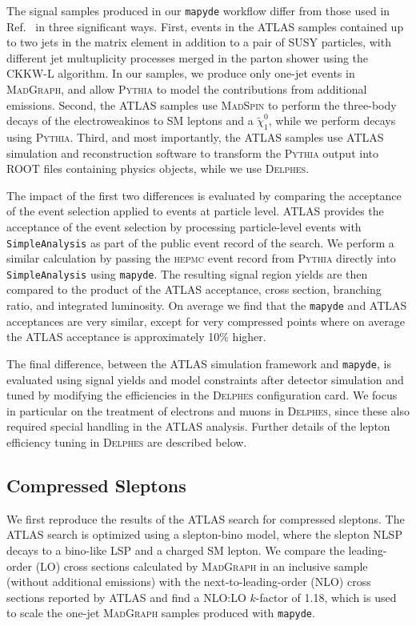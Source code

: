\documentclass{article}
\newcommand{\chioz}{\ensuremath{\widetilde{\chi}_{1}^{0}}}
\newcommand{\mapyde}{\texttt{mapyde}}
\newcommand{\simpleanalysis}{\texttt{SimpleAnalysis}}
\newcommand{\madgraph}{\textsc{MadGraph}}
\newcommand{\madspin}{\textsc{MadSpin}}
\newcommand{\pythia}{\textsc{Pythia}}
\newcommand{\delphes}{\textsc{Delphes}}
\newcommand{\hepmc}{\textsc{hepmc}}
\begin{document}
The signal samples produced in our \mapyde{} workflow differ from those used in Ref.~\cite{ATLAS:2019lng} in three significant ways.  First, events in the ATLAS samples contained up to two jets in the matrix element in addition to a pair of SUSY particles, with different jet multuplicity processes merged in the parton shower using the CKKW-L algorithm.  In our samples, we produce only one-jet events in \madgraph, and allow \pythia{} to model the contributions from additional emissions.  Second, the ATLAS samples use \madspin{} to perform the three-body decays of the electroweakinos to SM leptons and a \chioz, while we perform decays using \pythia.  Third, and most importantly, the ATLAS samples use ATLAS simulation and reconstruction software to transform the \pythia{} output into ROOT files containing physics objects, while we use \delphes.

The impact of the first two differences is evaluated by comparing the acceptance of the event selection applied to events at particle level.  ATLAS provides the acceptance of the event selection by processing particle-level events with \simpleanalysis{} as part of the public event record of the search.  We perform a similar calculation by passing the \hepmc{} event record from \pythia{} directly into \simpleanalysis{} using \mapyde.  The resulting signal region yields are then compared to the product of the ATLAS acceptance, cross section, branching ratio, and integrated luminosity.  On average we find that the \mapyde{} and ATLAS acceptances are very similar, except for very compressed points where on average the ATLAS acceptance is approximately 10\% higher.

The final difference, between the ATLAS simulation framework and \mapyde, is evaluated using signal yields and model constraints after detector simulation and tuned by modifying the efficiencies in the \delphes{} configuration card.  We focus in particular on the treatment of electrons and muons in \delphes, since these also required special handling in the ATLAS analysis.  Further details of the lepton efficiency tuning in \delphes{} are described below.

\subsection{Compressed Sleptons}
\label{ssec:compressed-sleptons}

We first reproduce the results of the ATLAS search for compressed sleptons.  The ATLAS search is optimized using a slepton-bino model, where the slepton NLSP decays to a bino-like LSP and a charged SM lepton.  We compare the leading-order (LO) cross sections calculated by \madgraph{} in an inclusive sample (without additional emissions) with the next-to-leading-order (NLO) cross sections reported by ATLAS and find a NLO:LO $k$-factor of 1.18, which is used to scale the one-jet \madgraph{} samples produced with \mapyde.
\end{document}
